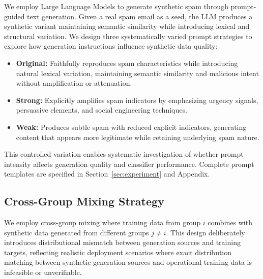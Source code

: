 We employ Large Language Models to generate synthetic spam through prompt-guided text generation. Given a real spam email as a seed, the LLM produces a synthetic variant maintaining semantic similarity while introducing lexical and structural variation. We design three systematically varied prompt strategies to explore how generation instructions influence synthetic data quality:
\begin{itemize}
    \item \textbf{Original:} Faithfully reproduces spam characteristics while introducing natural lexical variation, maintaining semantic similarity and malicious intent without amplification or attenuation.

    \item \textbf{Strong:} Explicitly amplifies spam indicators by emphasizing urgency signals, persuasive elements, and social engineering techniques.

    \item \textbf{Weak:} Produces subtle spam with reduced explicit indicators, generating content that appears more legitimate while retaining underlying spam nature.
    
\end{itemize}

This controlled variation enables systematic investigation of whether prompt intensity affects generation quality and classifier performance. Complete prompt templates are specified in Section~\ref{sec:experiment} and Appendix. 

\subsection{Cross-Group Mixing Strategy}

We employ cross-group mixing where training data from group $i$ combines with synthetic data generated from different groups $j \neq i$. This design deliberately introduces distributional mismatch between generation sources and training targets, reflecting realistic deployment scenarios where exact distribution matching between synthetic generation sources and operational training data is infeasible or unverifiable.

